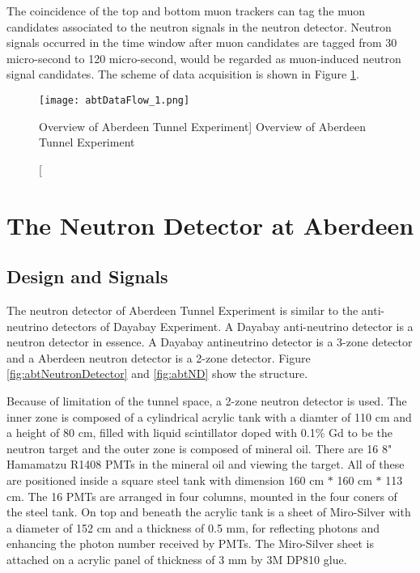 The coincidence of the top and bottom muon trackers can tag the muon candidates
associated to the neutron signals in the neutron detector. Neutron signals occurred
in the time window after muon candidates are tagged from 30 micro-second to
120 micro-second, would be regarded as muon-induced neutron signal candidates.
The scheme of data acquisition is shown in Figure
\ref{fig:abtDataFlow}.



\begin{figure}
    \label{fig:abtDataFlow}
    \centering
    \texttt{[image: abtDataFlow\_1.png]}
    \caption
    [Overview of Aberdeen Tunnel Experiment]
    {Overview of Aberdeen Tunnel Experiment}
    \end{figure}


\section{The Neutron Detector at Aberdeen}
\label{sec:ND}
\subsection{Design and Signals}

The neutron detector of Aberdeen Tunnel Experiment is similar to the
anti-neutrino detectors of Dayabay Experiment. A Dayabay anti-neutrino
detector is a neutron detector in essence. A Dayabay antineutrino detector is a
3-zone detector and a Aberdeen neutron detector is a 2-zone detector.
Figure \ref{fig:abtNeutronDetector} and \ref{fig:abtND} show the structure.

Because of limitation of the tunnel space, a 2-zone neutron detector is used.
The inner zone is composed of a cylindrical acrylic tank with a diamter of 110 cm and a height of 80 cm,
filled with liquid scintillator doped with 0.1\% Gd to be the neutron target and
the outer zone is composed of mineral oil. There are 16 8" Hamamatzu R1408 PMTs in the mineral oil and viewing the target.
All of these are positioned inside a square steel tank with dimension 160 cm $*$ 160 cm $*$ 113 cm. The 16 PMTs
are arranged in four columns, mounted in the four coners of the steel tank. On top and beneath the acrylic tank is
a sheet of Miro-Silver \cite{MiroSilver} with a diameter of 152 cm and a thickness of 0.5 mm, for reflecting photons and
enhancing the photon number received by PMTs.
The Miro-Silver sheet is attached on a acrylic panel of thickness of 3 mm by 3M DP810 \cite{3M} glue.


